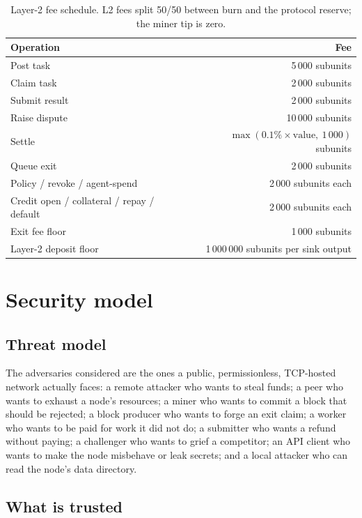 \documentclass{article}
\begin{document}
\begin{table}[htbp]
\centering
\begin{tabular}{lr}
\toprule
\textbf{Operation} & \textbf{Fee} \\
\midrule
Post task & 5\,000 subunits \\
Claim task & 2\,000 subunits \\
Submit result & 2\,000 subunits \\
Raise dispute & 10\,000 subunits \\
Settle & $\max(0.1\% \times \text{value},\ 1\,000)$ subunits \\
Queue exit & 2\,000 subunits \\
Policy / revoke / agent-spend & 2\,000 subunits each \\
Credit open / collateral / repay / default & 2\,000 subunits each \\
Exit fee floor & 1\,000 subunits \\
Layer-2 deposit floor & 1\,000\,000 subunits per sink output \\
\bottomrule
\end{tabular}
\caption{Layer-2 fee schedule. L2 fees split 50/50 between burn and the
protocol reserve; the miner tip is zero.}
\label{tab:fees}
\end{table}


\section{Security model}
\label{sec:security}

\subsection{Threat model}

The adversaries considered are the ones a public, permissionless, TCP-hosted
network actually faces: a remote attacker who wants to steal funds; a peer who
wants to exhaust a node's resources; a miner who wants to commit a block that
should be rejected; a block producer who wants to forge an exit claim; a worker
who wants to be paid for work it did not do; a submitter who wants a refund
without paying; a challenger who wants to grief a competitor; an API client
who wants to make the node misbehave or leak secrets; and a local attacker who
can read the node's data directory.

\subsection{What is trusted}
\end{document}
